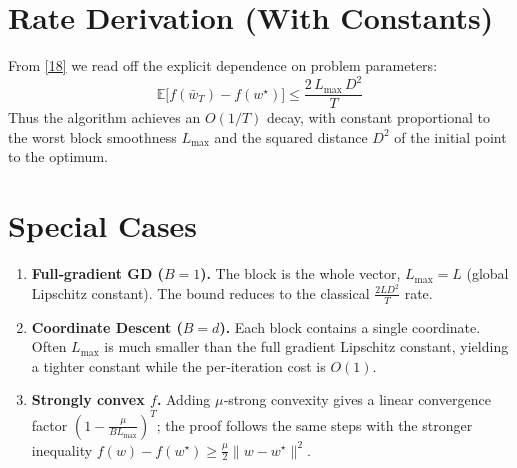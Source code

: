 \documentclass{article}
\newcommand{\E}{\mathbb{E}}
\begin{document}
\section*{Rate Derivation (With Constants)}
From \eqref{18} we read off the explicit dependence on problem parameters:
\[
\boxed{
\E\!\big[f(\bar w_{T})-f(w^{\star})\big]
\le \frac{2\,L_{\max}\,D^{2}}{T}
}
\]
Thus the algorithm achieves an $O(1/T)$ decay, with constant proportional to the
worst block smoothness $L_{\max}$ and the squared distance $D^{2}$ of the
initial point to the optimum.

\section*{Special Cases}
\begin{enumerate}[leftmargin=*]
\item \textbf{Full‑gradient GD ($B=1$).}  The block is the whole vector,
$L_{\max}=L$ (global Lipschitz constant).  The bound reduces to the classical
$\frac{2LD^{2}}{T}$ rate.
\item \textbf{Coordinate Descent ($B=d$).}  Each block contains a single
coordinate.  Often $L_{\max}$ is much smaller than the full gradient Lipschitz
constant, yielding a tighter constant while the per‑iteration cost is
$O(1)$.
\item \textbf{Strongly convex $f$.}  Adding $\mu$‑strong convexity gives a linear
convergence factor $(1-\frac{\mu}{B L_{\max}})^{T}$; the proof follows the same
steps with the stronger inequality
$f(w)-f(w^{\star})\ge\frac{\mu}{2}\|w-w^{\star}\|^{2}$.
\end{enumerate}
\end{document}
